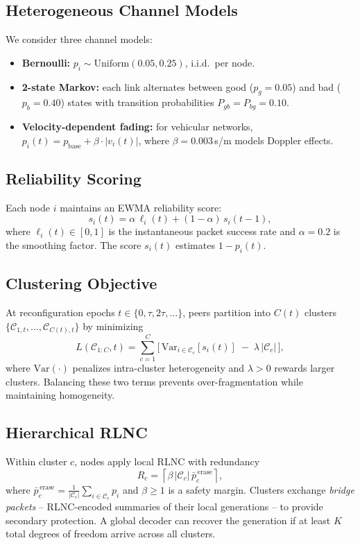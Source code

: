 \documentclass[journal]{IEEEtran}
\begin{document}
\subsection{Heterogeneous Channel Models}
We consider three channel models:
\begin{itemize}
\item \textbf{Bernoulli:} $p_i \sim \text{Uniform}(0.05, 0.25)$, i.i.d.\ per node.
\item \textbf{2-state Markov:} each link alternates between good ($p_g = 0.05$) and bad ($p_b = 0.40$) states with transition probabilities $P_{gb} = P_{bg} = 0.10$.
\item \textbf{Velocity-dependent fading:} for vehicular networks, $p_i(t) = p_{\text{base}} + \beta \cdot |v_i(t)|$, where $\beta = 0.003$\,s/m models Doppler effects.
\end{itemize}

\subsection{Reliability Scoring}
Each node $i$ maintains an EWMA reliability score:
\begin{equation}
s_i(t) = \alpha\, \ell_i(t) + (1-\alpha)\, s_i(t-1),
\label{eq:ewma}
\end{equation}
where $\ell_i(t) \in [0,1]$ is the instantaneous packet success rate and $\alpha = 0.2$ is the smoothing factor. The score $s_i(t)$ estimates $1 - p_i(t)$.

\subsection{Clustering Objective}
At reconfiguration epochs $t \in \{0, \tau, 2\tau, \dots\}$, peers partition into $C(t)$ clusters $\{\mathcal{C}_{1,t},\dots,\mathcal{C}_{C(t),t}\}$ by minimizing
\begin{equation}
L(\mathcal{C}_{1:C}, t) = \sum_{c=1}^{C} \Big[\, \mathrm{Var}_{i \in \mathcal{C}_c}[s_i(t)] \;-\; \lambda\,|\mathcal{C}_c| \,\Big],
\label{eq:cluster-loss}
\end{equation}
where $\mathrm{Var}(\cdot)$ penalizes intra-cluster heterogeneity and $\lambda > 0$ rewards larger clusters. Balancing these two terms prevents over-fragmentation while maintaining homogeneity.

\subsection{Hierarchical RLNC}
Within cluster $c$, nodes apply local RLNC with redundancy
\begin{equation}
R_c = \left\lceil \beta\, |\mathcal{C}_c| \, \bar{p}_c^{\,\text{erase}} \right\rceil,
\label{eq:redundancy}
\end{equation}
where $\bar{p}_c^{\,\text{erase}} = \frac{1}{|\mathcal{C}_c|}\sum_{i \in \mathcal{C}_c} p_i$ and $\beta \geq 1$ is a safety margin. Clusters exchange \emph{bridge packets} -- RLNC-encoded summaries of their local generations -- to provide secondary protection. A global decoder can recover the generation if at least $K$ total degrees of freedom arrive across all clusters.
\end{document}
